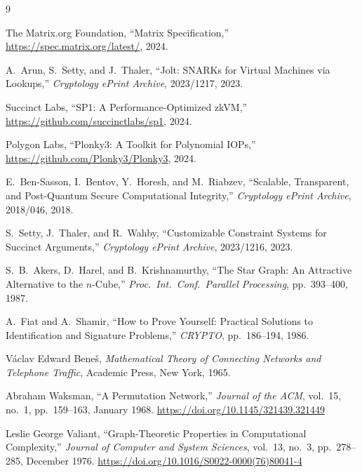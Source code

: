 \documentclass[11pt,a4paper]{article}
\begin{document}
\begin{thebibliography}{9}

  The Matrix.org Foundation,
  ``Matrix Specification,''
  \url{https://spec.matrix.org/latest/}, 2024.

  A.~Arun, S.~Setty, and J.~Thaler,
  ``Jolt: SNARKs for Virtual Machines via Lookups,''
  \emph{Cryptology ePrint Archive}, 2023/1217, 2023.

  Succinct Labs,
  ``SP1: A Performance-Optimized zkVM,''
  \url{https://github.com/succinctlabs/sp1}, 2024.

  Polygon Labs,
  ``Plonky3: A Toolkit for Polynomial IOPs,''
  \url{https://github.com/Plonky3/Plonky3}, 2024.

  E.~Ben-Sasson, I.~Bentov, Y.~Horesh, and M.~Riabzev,
  ``Scalable, Transparent, and Post-Quantum Secure
  Computational Integrity,''
  \emph{Cryptology ePrint Archive}, 2018/046, 2018.

  S.~Setty, J.~Thaler, and R.~Wahby,
  ``Customizable Constraint Systems for Succinct Arguments,''
  \emph{Cryptology ePrint Archive}, 2023/1216, 2023.

  S.~B.~Akers, D.~Harel, and B.~Krishnamurthy,
  ``The Star Graph: An Attractive Alternative to the $n$-Cube,''
  \emph{Proc.\ Int.\ Conf.\ Parallel Processing}, pp.~393--400, 1987.

  A.~Fiat and A.~Shamir,
  ``How to Prove Yourself: Practical Solutions to Identification
  and Signature Problems,''
  \emph{CRYPTO}, pp.~186--194, 1986.

  V\'{a}clav Edward Bene\v{s},
  \emph{Mathematical Theory of Connecting Networks and
  Telephone Traffic},
  Academic Press, New York, 1965.

  Abraham Waksman,
  ``A Permutation Network,''
  \emph{Journal of the ACM}, vol.~15, no.~1,
  pp.~159--163, January 1968.
  \url{https://doi.org/10.1145/321439.321449}

  Leslie George Valiant,
  ``Graph-Theoretic Properties in Computational Complexity,''
  \emph{Journal of Computer and System Sciences}, vol.~13,
  no.~3, pp.~278--285, December 1976.
  \url{https://doi.org/10.1016/S0022-0000(76)80041-4}

\end{thebibliography}
\end{document}
